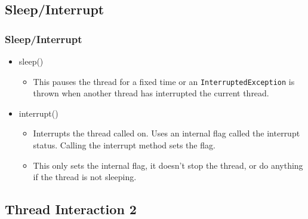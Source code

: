 \documentclass{beamer}
\begin{document}
\subsection{Sleep/Interrupt}
\begin{frame}
\frametitle{Sleep/Interrupt}
\begin{itemize}
\item sleep()
\begin{itemize}
\item This pauses the thread for a fixed time or an \texttt{InterruptedException} is thrown when another thread has interrupted the current thread.
\end{itemize}
\item interrupt()
\begin{itemize}
\item Interrupts the thread called on. Uses an internal flag called the {\color{red} interrupt status}. Calling the interrupt method sets the flag.
\item This only sets the internal flag, it doesn't stop the thread, or do anything if the thread is not sleeping.
\end{itemize}
\end{itemize}
\end{frame}
\subsection{Thread Interaction 2}
\end{document}
